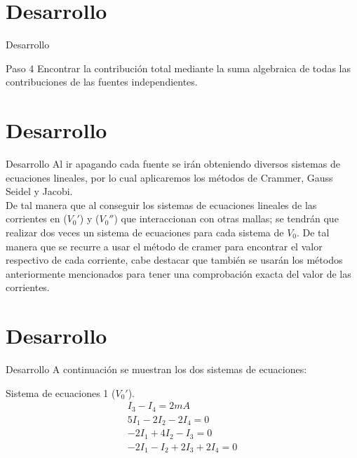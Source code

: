 \documentclass[11pt]{beamer}
\begin{document}
       \section{Desarrollo}
      \begin{frame}{Desarrollo}
       \begin{block}{Paso 4}
\justifying
Encontrar la contribución total mediante la suma algebraica de todas las contribuciones de las fuentes independientes.
\end{block}
      \end{frame}  
      
      \section{Desarrollo}
      \begin{frame}{Desarrollo}
\justifying
Al ir apagando cada fuente se irán obteniendo diversos sistemas de ecuaciones lineales, por lo cual aplicaremos los métodos de Crammer, Gauss Seidel y Jacobi.\\ 

De tal manera que al conseguir los sistemas de ecuaciones lineales de las corrientes en ($V_0'$) y ($V_0''$) que interaccionan con otras mallas; se tendrán que realizar dos veces un sistema de ecuaciones para cada sistema de $V_0$. De tal manera que se recurre a usar el método de cramer para encontrar el valor respectivo de cada corriente, cabe destacar que también se usarán los métodos anteriormente mencionados para tener una comprobación exacta del valor de las corrientes.
      \end{frame}
      
      \section{Desarrollo}
      \begin{frame}{Desarrollo}
      \justifying
      A continuación se muestran los dos sistemas de ecuaciones:
       \begin{block}{Sistema de ecuaciones 1 ($V_0'$).}
\begin{eqnarray}
I_{3} - I_{4} = 2mA\\
5I_{1} - 2I_{2} - 2I_{4} = 0\\
-2I_{1} + 4I_{2} - I_{3} = 0\\
-2I_{1} - I_{2} + 2I_{3} + 2I_{4} = 0
\end{eqnarray}
\end{block}
      \end{frame}
      
\end{document}
